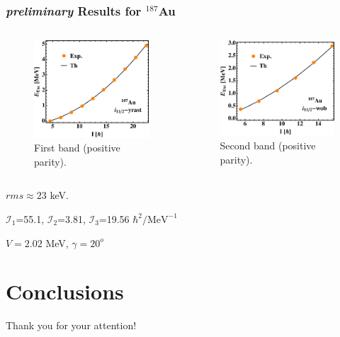 \documentclass{beamer}
\begin{document}
\begin{frame}
    \frametitle{{\tiny \emph{preliminary}} Results for $^{187}$Au}
    \begin{columns}[c] 
     \begin{figure}
         \centering
         \includegraphics[scale=0.4]{figs/Au_187_1.pdf}
         \caption{First band (positive parity).}
     \end{figure}
     \begin{figure}
         \centering
         \includegraphics[scale=0.4]{figs/Au_187_2.pdf}
         \caption{Second band (positive parity).}
     \end{figure}
    \end{columns}
    \par $rms\approx23$ keV.
    \par $\mathcal{I}_1$=55.1, $\mathcal{I}_2$=3.81, $\mathcal{I}_3$=19.56 $\hbar^2/\text{MeV}^{-1}$
    \par $V=2.02$ MeV, $\gamma=20^o$
\end{frame}

\section{Conclusions}

  \begin{frame}
  \centering
    \Large{Thank you for your attention!}
  \end{frame}
\end{document}
